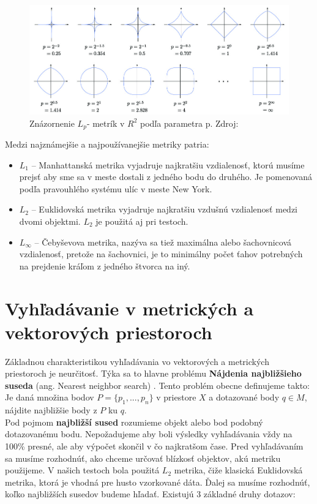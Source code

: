 \documentclass[12pt,a4paper,oneside]{fithesis2}
\begin{document}
	\begin{figure}[h!]
  		\centering
  		\includegraphics[width=\textwidth]{obr/lp.jpg}
  		\caption{Znázornenie $L_p$- metrík v $R^2$ podľa parametra p. Zdroj:\cite{lp}}
	\end{figure}  

Medzi najznámejšie a najpoužívanejšie metriky patria:
\begin{itemize}
\item $L_1$ -- Manhattanská metrika vyjadruje najkratšiu vzdialenosť, ktorú musíme prejsť aby sme sa v meste dostali z jedného bodu do druhého. Je pomenovaná podľa pravouhlého systému ulíc v meste New York.
\item $L_2$ -- Euklidovská metrika vyjadruje najkratšiu vzdušnú vzdialenosť medzi dvomi objektmi. $L_2$ je použitá aj pri testoch.
\item $L_\infty $ -- Čebyševova metrika, nazýva sa tiež maximálna alebo šachovnicová vzdialenosť, pretože na šachovnici, je to minimálny počet ťahov potrebných na prejdenie kráľom z jedného štvorca na iný.
\end{itemize}
   \chapter{Vyhľadávanie v metrických a vektorových priestoroch}
   Základnou charakteristikou vyhľadávania vo vektorových a metrických priestoroch je neurčitosť. Týka sa to hlavne problému \textbf{Nájdenia najbližšieho suseda} (ang. Nearest neighbor search) \cite{nns2009}. Tento problém obecne definujeme takto: \\
   Je daná množina bodov $P=\{p_1,...,p_n\}$ v priestore $X$ a dotazované body $q \in M$, nájdite najbližšie body z $P$ ku $q$.\\
   Pod pojmom \textbf{najbližší sused} rozumieme objekt alebo bod podobný dotazovanému bodu. Nepožadujeme aby boli výsledky vyhľadávania vždy na 100\% presné, ale aby výpočet skončil v čo najkratšom čase.
   Pred vyhľadávaním sa musíme rozhodnúť, ako chceme určovať blízkosť objektov, akú metriku použijeme. V našich testoch bola použitá $L_2$ metrika, čiže klasická Euklidovská metrika, ktorá je vhodná pre husto vzorkované dáta. Ďalej sa musíme rozhodnúť, koľko najbližších susedov budeme hľadať. Existujú 3 základné druhy dotazov:
\end{document}

